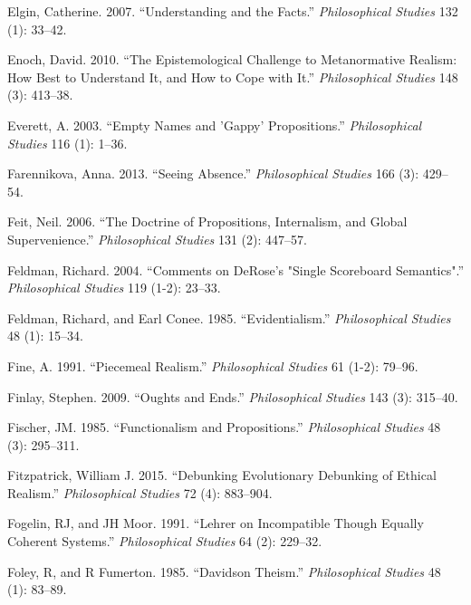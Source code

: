 \documentclass[
  10pt,
  letterpaper,
  DIV=11,
  numbers=noendperiod,
  twoside]{scrartcl}
\newlength{\cslhangindent}
\newenvironment{CSLReferences}[2] %
 {\begin{list}{}{%
  \setlength{\itemindent}{0pt}
  \setlength{\leftmargin}{0pt}
  \setlength{\parsep}{0pt}
  \ifodd #1
   \setlength{\leftmargin}{\cslhangindent}
   \setlength{\itemindent}{-1\cslhangindent}
  \fi
  \setlength{\itemsep}{#2\baselineskip}}}
 {\end{list}}
\begin{document}
\begin{CSLReferences}{1}{0}
Elgin, Catherine. 2007. {``Understanding and the Facts.''}
\emph{Philosophical Studies} 132 (1): 33--42.

Enoch, David. 2010. {``The Epistemological Challenge to Metanormative
Realism: How Best to Understand It, and How to Cope with It.''}
\emph{Philosophical Studies} 148 (3): 413--38.

Everett, A. 2003. {``Empty Names and 'Gappy' Propositions.''}
\emph{Philosophical Studies} 116 (1): 1--36.

Farennikova, Anna. 2013. {``Seeing Absence.''} \emph{Philosophical
Studies} 166 (3): 429--54.

Feit, Neil. 2006. {``The Doctrine of Propositions, Internalism, and
Global Supervenience.''} \emph{Philosophical Studies} 131 (2): 447--57.

Feldman, Richard. 2004. {``Comments on DeRose's "Single Scoreboard
Semantics".''} \emph{Philosophical Studies} 119 (1-2): 23--33.

Feldman, Richard, and Earl Conee. 1985. {``Evidentialism.''}
\emph{Philosophical Studies} 48 (1): 15--34.

Fine, A. 1991. {``Piecemeal Realism.''} \emph{Philosophical Studies} 61
(1-2): 79--96.

Finlay, Stephen. 2009. {``Oughts and Ends.''} \emph{Philosophical
Studies} 143 (3): 315--40.

Fischer, JM. 1985. {``Functionalism and Propositions.''}
\emph{Philosophical Studies} 48 (3): 295--311.

Fitzpatrick, William J. 2015. {``Debunking Evolutionary Debunking of
Ethical Realism.''} \emph{Philosophical Studies} 72 (4): 883--904.

Fogelin, RJ, and JH Moor. 1991. {``Lehrer on Incompatible Though Equally
Coherent Systems.''} \emph{Philosophical Studies} 64 (2): 229--32.

Foley, R, and R Fumerton. 1985. {``Davidson Theism.''}
\emph{Philosophical Studies} 48 (1): 83--89.


\end{CSLReferences}
\end{document}
